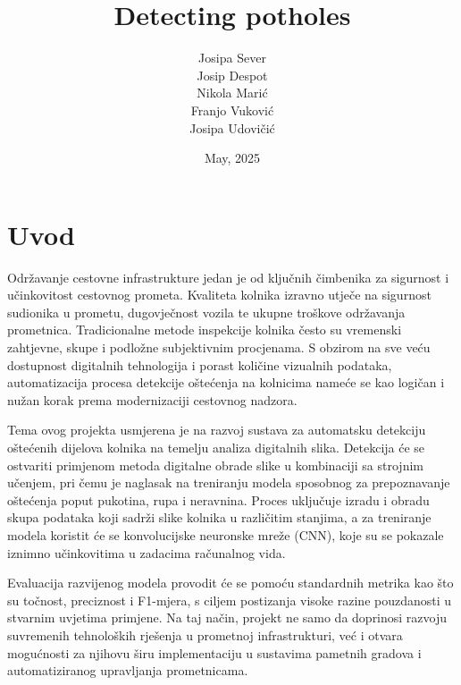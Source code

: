 \documentclass[seminarskirad]{fer}
\title{Detecting potholes}
\author{Josipa Sever\\ Josip Despot\\ Nikola Marić\\ Franjo Vuković\\ Josipa Udovičić}
\date{May, 2025}
\begin{document}
\maketitle


\mainmatter





\tableofcontents


\chapter{Uvod}
\label{pog:uvod}

Održavanje cestovne infrastrukture jedan je od ključnih čimbenika za sigurnost i učinkovitost cestovnog prometa. Kvaliteta kolnika izravno utječe na sigurnost sudionika u prometu, dugovječnost vozila te ukupne troškove održavanja prometnica. Tradicionalne metode inspekcije kolnika često su vremenski zahtjevne, skupe i podložne subjektivnim procjenama. S obzirom na sve veću dostupnost digitalnih tehnologija i porast količine vizualnih podataka, automatizacija procesa detekcije oštećenja na kolnicima nameće se kao logičan i nužan korak prema modernizaciji cestovnog nadzora.

Tema ovog projekta usmjerena je na razvoj sustava za automatsku detekciju oštećenih dijelova kolnika na temelju analiza digitalnih slika. Detekcija će se ostvariti primjenom metoda digitalne obrade slike u kombinaciji sa strojnim učenjem, pri čemu je naglasak na treniranju modela sposobnog za prepoznavanje oštećenja poput pukotina, rupa i neravnina. Proces uključuje izradu i obradu skupa podataka koji sadrži slike kolnika u različitim stanjima, a za treniranje modela koristit će se konvolucijske neuronske mreže (CNN), koje su se pokazale iznimno učinkovitima u zadacima računalnog vida.

Evaluacija razvijenog modela provodit će se pomoću standardnih metrika kao što su točnost, preciznost i F1-mjera, s ciljem postizanja visoke razine pouzdanosti u stvarnim uvjetima primjene. Na taj način, projekt ne samo da doprinosi razvoju suvremenih tehnoloških rješenja u prometnoj infrastrukturi, već i otvara mogućnosti za njihovu širu implementaciju u sustavima pametnih gradova i automatiziranog upravljanja prometnicama.
\end{document}
